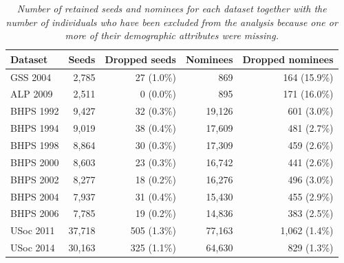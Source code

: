 \documentclass{scrartcl}
\newcommand{\titlecaption}[2]{\caption[#1]{\emph{#1} #2}}
\begin{document}
\begin{table}
    \begin{tabularx}{\columnwidth}{lrrrr}
        \toprule %
        Dataset & Seeds & Dropped seeds & Nominees & Dropped nominees \\
        \midrule %
        GSS 2004        & 2,785     & 27 (1.0\%) & 869 & 164 (15.9\%) \\
        ALP 2009        & 2,511     & 0 (0.0\%) & 895 & 171 (16.0\%) \\
        BHPS 1992       & 9,427     & 32 (0.3\%) & 19,126 & 601 (3.0\%) \\
        BHPS 1994       & 9,019     & 38 (0.4\%) & 17,609 & 481 (2.7\%) \\
        BHPS 1998       & 8,864     & 30 (0.3\%) & 17,309 & 459 (2.6\%) \\
        BHPS 2000       & 8,603     & 23 (0.3\%) & 16,742 & 441 (2.6\%) \\
        BHPS 2002       & 8,277     & 18 (0.2\%) & 16,276 & 496 (3.0\%) \\
        BHPS 2004       & 7,937     & 31 (0.4\%) & 15,430 & 455 (2.9\%) \\
        BHPS 2006       & 7,785     & 19 (0.2\%) & 14,836 & 383 (2.5\%) \\
        USoc 2011       & 37,718    & 505 (1.3\%) & 77,163 & 1,062 (1.4\%) \\
        USoc 2014       & 30,163    & 325 (1.1\%) & 64,630 & 829 (1.3\%) \\
        \bottomrule %
    \end{tabularx}
    \titlecaption{Number of retained seeds and nominees for each dataset together with the number of individuals who have been excluded from the analysis because one or more of their demographic attributes were missing.}{\label{tbl:survey-sample-size}}
\end{table}
\end{document}
